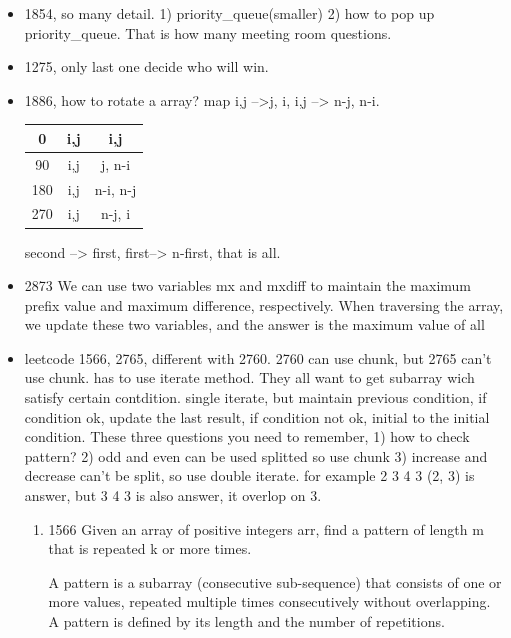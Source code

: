 \documentclass[a4paper,11pt,twoside]{book}
\begin{document}
\begin{itemize}
		
		\item 1854, so many detail. 1) priority\_queue(smaller) 2) how to pop up priority\_queue. That is how many meeting room questions.   
	
	
		\item 1275, only last one decide who will win. 
	
	\item 1886, how to rotate a array?  map i,j -->j, i,  i,j --> n-j, n-i. 
	
	\begin{tabular}{|c|c|c|}
		\hline
		0 & i,j  & i,j  \\
		\hline
		90 &i,j & j, n-i \\
		\hline
		180	& i,j& n-i, n-j \\
		\hline
		270	& i,j& n-j, i \\
		\hline
	\end{tabular}
	
	second --> first,  first--> n-first, that is all. 
	
	
		\item 2873 We can use two variables mx and mxdiff to maintain the maximum prefix value and maximum difference, respectively. When traversing the array, we update these two variables, and the answer is the maximum value of all 
		
	
		\item leetcode 1566, 2765, different with 2760. 2760 can use chunk, but 2765 can't use chunk. has to use iterate method. 
	They all want to get subarray wich satisfy certain contdition. single iterate, but maintain previous condition, if condition ok, update the last result, if condition not ok, initial to the initial condition.  These three questions you need to remember, 1) how to check pattern? 2) odd and even can be used splitted so use chunk 3) increase and decrease can't be split, so use double iterate. for example 2 3 4 3  (2, 3) is answer, but 3 4 3 is also answer,  it overlop on 3. 
	\begin{enumerate}
		\item 1566 Given an array of positive integers arr, find a pattern of length m that is repeated k or more times.
		
		A pattern is a subarray (consecutive sub-sequence) that consists of one or more values, repeated multiple times consecutively without overlapping. A pattern is defined by its length and the number of repetitions.
		

\end{enumerate}
\end{itemize}
\end{document}
